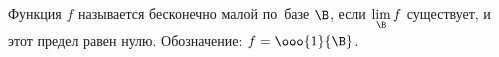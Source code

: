 
 Функция $f$ называется бесконечно малой по~базе $\B$, если $\lim\limits_{\B}f$ существует, и этот предел равен нулю. 
 Обозначение: $f=\ooo{1}{\B}$.
 